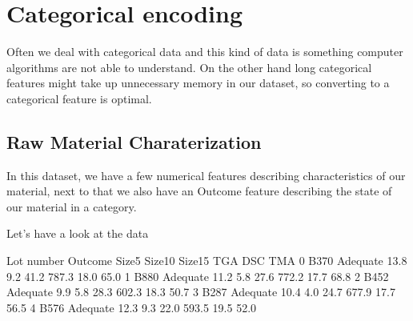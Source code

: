 \documentclass[letterpaper,10pt,english]{jupyterBook}
\begin{document}
\chapter{Categorical encoding}
\label{\detokenize{c2_data_preparation/categorical_encoding:categorical-encoding}}\label{\detokenize{c2_data_preparation/categorical_encoding::doc}}
\sphinxAtStartPar
Often we deal with categorical data and this kind of data is something computer algorithms are not able to understand.
On the other hand long categorical features might take up unnecessary memory in our dataset, so converting to a categorical feature is optimal.

\begin{sphinxVerbatim}[commandchars=\\\{\}]
   
\end{sphinxVerbatim}


\section{Raw Material Charaterization}
\label{\detokenize{c2_data_preparation/categorical_encoding:raw-material-charaterization}}
\sphinxAtStartPar
In this dataset, we have a few numerical features describing characteristics of our material, next to that we also have an Outcome feature describing the state of our material in a category.

\sphinxAtStartPar
Let’s have a look at the data

\begin{sphinxVerbatim}[commandchars=\\\{\}]
  
\end{sphinxVerbatim}

\begin{sphinxVerbatim}[commandchars=\\\{\}]
  Lot number   Outcome  Size5  Size10  Size15    TGA   DSC   TMA
0       B370  Adequate   13.8     9.2    41.2  787.3  18.0  65.0
1       B880  Adequate   11.2     5.8    27.6  772.2  17.7  68.8
2       B452  Adequate    9.9     5.8    28.3  602.3  18.3  50.7
3       B287  Adequate   10.4     4.0    24.7  677.9  17.7  56.5
4       B576  Adequate   12.3     9.3    22.0  593.5  19.5  52.0
\end{sphinxVerbatim}
\end{document}
